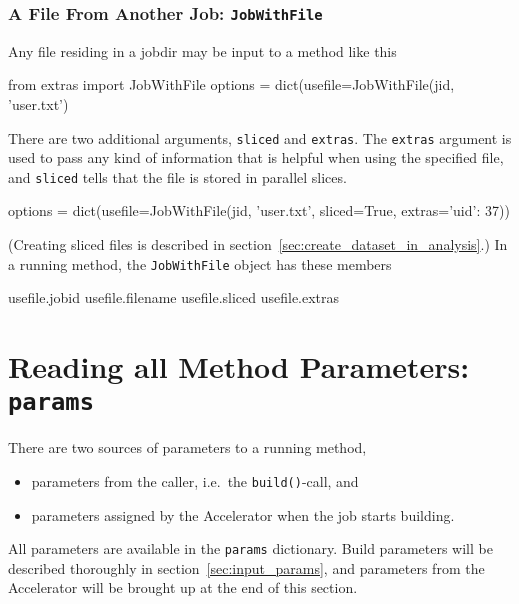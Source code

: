 \subsubsection*{A File From Another Job:  \texttt{JobWithFile}}

Any file residing in a jobdir may be input to a method like this
\begin{python}
from extras import JobWithFile
options = dict(usefile=JobWithFile(jid, 'user.txt')
\end{python}
There are two additional arguments, \texttt{sliced} and
\texttt{extras}.  The \texttt{extras} argument is used to pass any
kind of information that is helpful when using the specified file, and
\texttt{sliced} tells that the file is stored in parallel slices.
\begin{python}
options = dict(usefile=JobWithFile(jid, 'user.txt', sliced=True, extras={'uid': 37}))
\end{python}
(Creating sliced files is described in section~\ref{sec:create_dataset_in_analysis}.)  In a
running method, the \texttt{JobWithFile} object has these members
\begin{python}
usefile.jobid
usefile.filename
usefile.sliced
usefile.extras
\end{python}



\section{Reading all Method Parameters:  \texttt{params}}

There are two sources of parameters to a running method,
\begin{itemize}
\item [] parameters from the caller, i.e.\ the \texttt{build()}-call, and
\item [] parameters assigned by the Accelerator when the job starts building.
\end{itemize}
All parameters are available in the \texttt{params} dictionary.  Build
parameters will be described thoroughly in
section~\ref{sec:input_params}, and parameters from the Accelerator
will be brought up at the end of this section.

